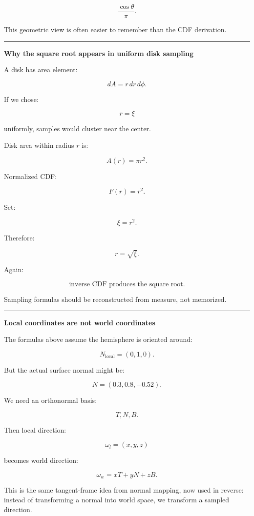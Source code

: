 \[
\frac{\cos\theta}{\pi}.
\]

This geometric view is often easier to remember than the CDF derivation.

\begin{center}\rule{0.5\linewidth}{0.5pt}\end{center}

\textbf{Why the square root appears in uniform disk sampling}

A disk has area element:

\[
dA=r\,dr\,d\phi.
\]

If we chose:

\[
r=\xi
\]

uniformly, samples would cluster near the center.

Disk area within radius \(r\) is:

\[
A(r)=\pi r^2.
\]

Normalized CDF:

\[
F(r)=r^2.
\]

Set:

\[
\xi=r^2.
\]

Therefore:

\[
\boxed{
r=\sqrt{\xi}.
}
\]

Again:

\[
\boxed{
\text{inverse CDF produces the square root.}
}
\]

Sampling formulas should be reconstructed from measure, not memorized.

\begin{center}\rule{0.5\linewidth}{0.5pt}\end{center}

\textbf{Local coordinates are not world coordinates}

The formulas above assume the hemisphere is oriented around:

\[
N_{\text{local}}=(0,1,0).
\]

But the actual surface normal might be:

\[
N=(0.3,0.8,-0.52).
\]

We need an orthonormal basis:

\[
T,
N,
B.
\]

Then local direction:

\[
\omega_l=(x,y,z)
\]

becomes world direction:

\[
\boxed{
\omega_w
=
xT+
yN+
zB.
}
\]

This is the same tangent-frame idea from normal mapping, now used in reverse: instead of transforming a normal into world space, we transform a sampled direction.

